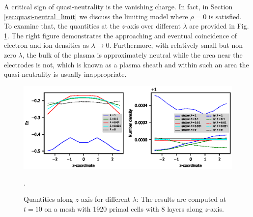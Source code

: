 \documentclass{report}
\begin{document}
A critical sign of quasi-neutrality is the vanishing charge. In fact, in Section \ref{sec:quasi-neutral_limit} we discuss the limiting model where $\rho = 0$ is satisfied. To examine that, the quantities at the $z$-axis over different $\lambda$ are provided in Fig. \ref{fig:zaxis-data_vs_z-T_10}. The right figure demonstrates the approaching and eventual coincidence of electron and ion densities as $\lambda \rightarrow 0$. Furthermore, with relatively small but non-zero $\lambda$, the bulk of the plasma is approximately neutral while the area near the electrodes is not, which is known as a plasma sheath and within such an area the quasi-neutrality is usually inappropriate.
\begin{figure}
    \centering
    \includegraphics{zaxis-data_vs_z-T_10.eps}
    \caption{Quantities along $z$-axis for different $\lambda$: The results are computed at $t = 10$ on a mesh with 1920 primal cells with 8 layers along $z$-axis.}.
    \label{fig:zaxis-data_vs_z-T_10}
\end{figure}
\end{document}
